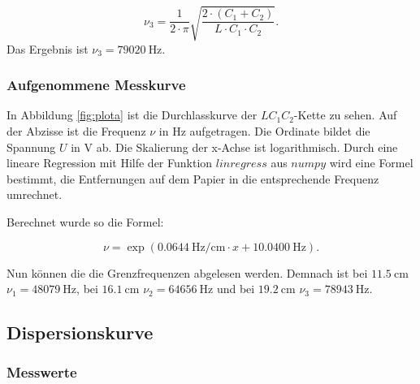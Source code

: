 \begin{equation}
  \nu_3 = \frac{1}{2\cdot\pi}\sqrt{\frac{2 \cdot (C_1+C_2)}{L \cdot C_1 \cdot C_2}}.
\end{equation}
Das Ergebnis ist $\nu_3 = \SI{79020}{\hertz}$.

\subsubsection{Aufgenommene Messkurve}

\begin{figure*}[p]
  \centering
  \caption{Aufgenommene Messkurve.}
  \label{fig:plota}
\end{figure*}

In Abbildung \ref{fig:plota} ist die Durchlasskurve der $LC_1C_2$-Kette zu
sehen. Auf der Abzisse ist die Frequenz $\nu$ in $\si{\hertz}$ aufgetragen. Die
Ordinate bildet die Spannung $U$ in $\si{\volt}$ ab. Die Skalierung der x-Achse
 ist logarithmisch. Durch eine lineare
Regression mit Hilfe der Funktion $linregress$ aus $numpy$ \cite{numpy} wird
eine Formel bestimmt, die Entfernungen auf dem Papier in die entsprechende
Frequenz umrechnet.

Berechnet wurde so die Formel:

\begin{equation}
  \nu = \exp(\SI{0,0644}{\hertz\per\centi\meter} \cdot x + \SI{10,0400}{\hertz}).
\end{equation}

Nun können die die Grenzfrequenzen abgelesen werden. Demnach ist bei $\SI{11,5}{\centi\meter}$
$\nu_1 = \SI{48079}{\hertz}$, bei $\SI{16,1}{\centi\meter}$ $\nu_2 = \SI{64656}{\hertz}$ und
bei $\SI{19,2}{\centi\meter}$ $\nu_3 = \SI{78943}{\hertz}$.

\subsection{Dispersionskurve}

\subsubsection{Messwerte}

